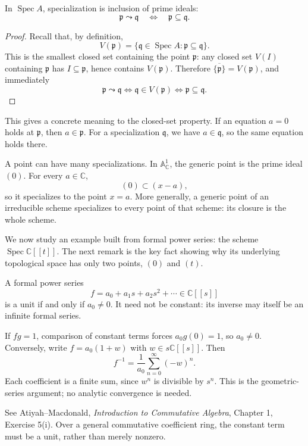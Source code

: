\begin{lemma}
\label{lemma-specialization-affine}
In $\operatorname{Spec}A$, specialization
is inclusion of prime ideals:
$$
\mathfrak{p}\leadsto\mathfrak{q}
\quad\Longleftrightarrow\quad
\mathfrak{p}\subseteq\mathfrak{q}.
$$
\end{lemma}

\begin{proof}
Recall that, by definition,
$$
V(\mathfrak{p})
=\{\mathfrak{q}\in\operatorname{Spec}A:
\mathfrak{p}\subseteq\mathfrak{q}\}.
$$
This is the smallest closed set containing
the point $\mathfrak{p}$:
any closed set $V(I)$ containing
$\mathfrak{p}$ has $I\subseteq\mathfrak{p}$,
hence contains $V(\mathfrak{p})$.
Therefore
$\overline{\{\mathfrak{p}\}}
=V(\mathfrak{p})$, and immediately
$$
\mathfrak{p}\leadsto\mathfrak{q}
\iff\mathfrak{q}\in V(\mathfrak{p})
\iff\mathfrak{p}\subseteq\mathfrak{q}.
$$
\end{proof}

This gives a concrete meaning to the
closed-set property.
If an equation $a=0$ holds at
$\mathfrak{p}$, then $a\in\mathfrak{p}$.
For a specialization $\mathfrak{q}$,
we have $a\in\mathfrak{q}$, so the same
equation holds there.

\begin{example}
\label{example-specialization-many}
A point can have many specializations.
In $\mathbb{A}^1_{\mathbb{C}}$, the
generic point is the prime ideal $(0)$.
For every $a\in\mathbb{C}$,
$$
(0)\subset(x-a),
$$
so it specializes to the point $x=a$.
More generally, a generic point of an
irreducible scheme specializes to every
point of that scheme: its closure is the
whole scheme.
\end{example}

\noindent
We now study an example built from formal
power series: the scheme
$\operatorname{Spec}\mathbb{C}[[t]]$.
The next remark is the key fact showing
why its underlying topological space
has only two points, $(0)$ and $(t)$.

\begin{remark}
\label{remark-units-formal-series}
A formal power series
$$
f=a_0+a_1s+a_2s^2+\cdots
\in\mathbb{C}[[s]]
$$
is a unit if and only if $a_0\neq0$.
It need not be constant: its inverse
may itself be an infinite formal series.

If $fg=1$, comparison of constant
terms forces $a_0g(0)=1$, so $a_0\neq0$.
Conversely, write $f=a_0(1+w)$ with
$w\in s\mathbb{C}[[s]]$. Then
$$
f^{-1}=\frac{1}{a_0}
\sum_{n=0}^{\infty}(-w)^n.
$$
Each coefficient is a finite sum, since
$w^n$ is divisible by $s^n$.
This is the geometric-series argument;
no analytic convergence is needed.

See Atiyah--Macdonald,
{\it Introduction to Commutative Algebra},
Chapter 1, Exercise 5(i).
Over a general commutative coefficient
ring, the constant term must be a unit,
rather than merely nonzero.
\end{remark}

